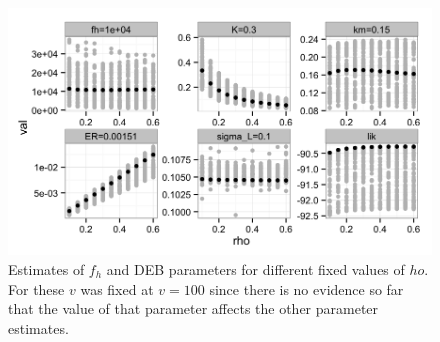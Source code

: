 \documentclass[12pt,reqno,final,pdftex]{amsart}\usepackage[]{graphicx}\usepackage[]{color}
\newenvironment{knitrout}{}{} %
\theoremstyle{plain}
\numberwithin{equation}{part}
\begin{document}
\begin{knitrout}\scriptsize
{}\color{fgcolor}\begin{figure}

\includegraphics[width=\linewidth]{figure/rho-profile-1} \hfill{}

\caption[Estimates of ]{Estimates of $f_h$ and DEB parameters for different fixed values of $
ho$. For these $v$ was fixed at $v=100$ since there is no evidence so far that the value of that parameter affects the other parameter estimates.}\label{fig:rho-profile}
\end{figure}


\end{knitrout}
\end{document}
